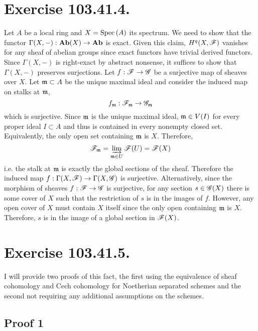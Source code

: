 \documentclass[12pt]{article}
\begin{document}
\section{Exercise 103.41.4.}

Let $A$ be a local ring and $X = \mathrm{Spec}\left( A \right)$ its spectrum. We need to show that the functor $\Gamma(X, -) : \mathbf{Ab}(X) \to \mathbf{Ab}$ is exact. Given this claim, $H^q(X, \mathscr{F})$ vanishes for any sheaf of abelian groups since exact functors have trivial derived functors. Since $\Gamma(X, -)$ is right-exact by abstract nonsense, it suffices to show that $\Gamma(X, -)$ preserves surjections. Let $f : \mathscr{F} \to \mathscr{G}$ be a surjective map of sheaves over $X$. Let $\mathfrak{m} \subset A$ be the unique maximal ideal and consider the induced map on stalks at $\mathfrak{m}$,
\[ f_{\mathfrak{m}} : \mathscr{F}_{\mathfrak{m}} \to \mathscr{G}_{\mathfrak{m}} \]
which is surjective. 
Since $\mathfrak{m}$ is the unique maximal ideal, $\mathfrak{m} \in V(I)$ for every proper ideal $I \subset A$ and thus is contained in every nonempty closed set. Equivalently, the only open set containing $\mathfrak{m}$ is $X$. Therefore,
\[ \mathscr{F}_{\mathfrak{m}} = \varinjlim_{\mathfrak{m} \in U} \mathscr{F}(U) = \mathscr{F}(X) \]
i.e. the stalk at $\mathfrak{m}$ is exactly the global sections of the sheaf. Therefore the induced map $f : \Gamma(X, \mathscr{F}) \to \Gamma(X, \mathscr{G})$ is surjective. Alternatively, since the morphism of sheaves $f : \mathscr{F} \to \mathscr{G}$ is surjective, for any section $s \in \mathscr{G}(X)$ there is some cover of $X$ such that the restriction of $s$ is in the images of $f$. However, any open cover of $X$ must contain $X$ itself since the only open containing $\mathfrak{m}$ is $X$. Therefore, $s$ is in the image of a global section in $\mathscr{F}(X)$.

\section{Exercise 103.41.5.}

I will provide two proofs of this fact, the first using the equivalence of sheaf cohomology and Cech cohomology for Noetherian separated schemes and the second not requiring any additional assumptions on the schemes.

\subsection{Proof 1} 
\end{document}
